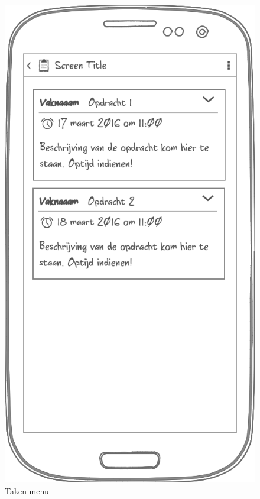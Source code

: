 \documentclass[a4paper]{article}
\begin{document}
\begin{appendices}
\newpage
\begin{figure}[H]
  \centerline{\includegraphics[width=\textwidth*4/5]{mobiel_taken}}
  \caption{Taken menu}
  \label{fig:mobiel_taken}
\end{figure}


\end{appendices}
\end{document}
